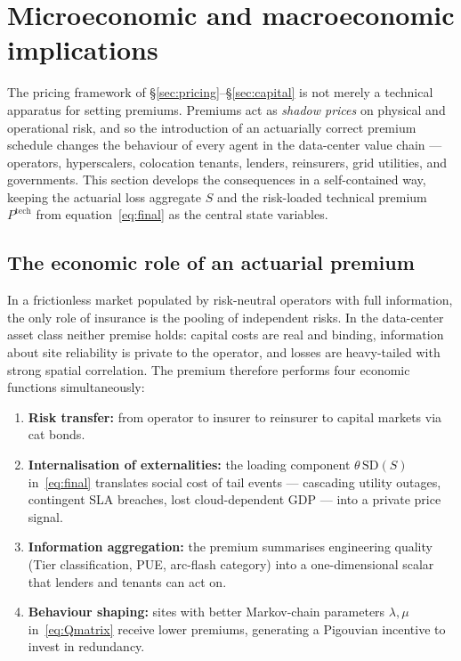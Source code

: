 \section{Microeconomic and macroeconomic implications}\label{sec:econ}

The pricing framework of \S\ref{sec:pricing}--\S\ref{sec:capital} is
not merely a technical apparatus for setting premiums. Premiums act
as \emph{shadow prices} on physical and operational risk, and so the
introduction of an actuarially correct premium schedule changes the
behaviour of every agent in the data-center value chain — operators,
hyperscalers, colocation tenants, lenders, reinsurers, grid utilities,
and governments. This section develops the consequences in a
self-contained way, keeping the actuarial loss aggregate $S$ and the
risk-loaded technical premium $P^{\mathrm{tech}}$ from
equation~\eqref{eq:final} as the central state variables.

\subsection{The economic role of an actuarial premium}\label{ss:role}

In a frictionless market populated by risk-neutral operators with full
information, the only role of insurance is the pooling of independent
risks. In the data-center asset class neither premise holds: capital
costs are real and binding, information about site reliability is
private to the operator, and losses are heavy-tailed with strong
spatial correlation. The premium therefore performs four economic
functions simultaneously:
\begin{enumerate}[leftmargin=*,nosep]
   \item \textbf{Risk transfer:} from operator to insurer to reinsurer
         to capital markets via cat bonds.
   \item \textbf{Internalisation of externalities:} the loading
         component $\theta\,\mathrm{SD}(S)$ in~\eqref{eq:final}
         translates social cost of tail events --- cascading utility
         outages, contingent SLA breaches, lost cloud-dependent GDP ---
         into a private price signal.
   \item \textbf{Information aggregation:} the premium summarises
         engineering quality (Tier classification, PUE, arc-flash
         category) into a one-dimensional scalar that lenders and
         tenants can act on.
   \item \textbf{Behaviour shaping:} sites with better Markov-chain
         parameters $\lambda,\mu$ in~\eqref{eq:Qmatrix} receive lower
         premiums, generating a Pigouvian incentive to invest in
         redundancy.
\end{enumerate}

